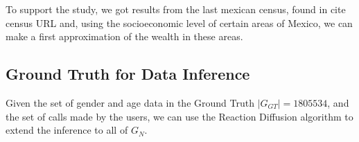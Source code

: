 To support the study, we got results from the last mexican census, found in {cite census URL} and, using the socioeconomic level of certain areas of Mexico, we can make a first approximation of the wealth in these areas.

\subsection{Ground Truth for Data Inference}

Given the set of gender and age data in the Ground Truth \( \left| G_{GT} \right| = 1805534 \), and the set of calls made by the users, we can use the Reaction Diffusion algorithm \cite{brea2014} to extend the inference to all of \( G_N \).

